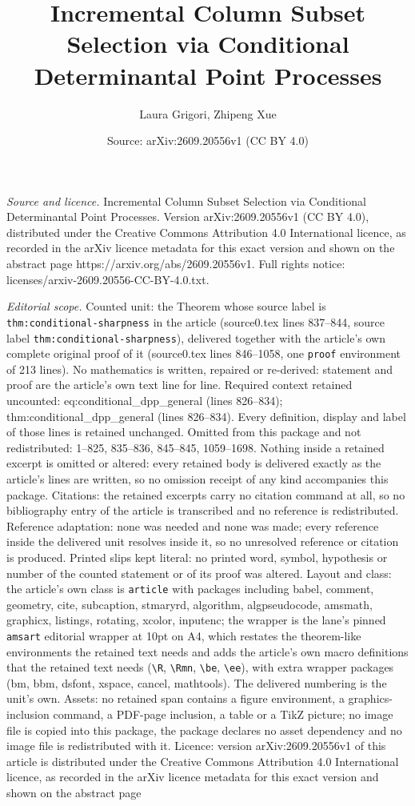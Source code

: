 \documentclass[10pt,a4paper]{amsart}
\title[Incremental Column Subset Selection via Conditional Determin]{Incremental Column Subset Selection via Conditional Determinantal Point Processes}
\author{Laura Grigori, Zhipeng Xue}
\date{Source: arXiv:2609.20556v1 (CC BY 4.0)}
\begin{document}
\maketitle

\noindent\emph{Source and licence.} Incremental Column Subset Selection via Conditional Determinantal Point Processes. Version arXiv:2609.20556v1 (CC BY 4.0), distributed under the Creative Commons Attribution 4.0 International licence, as recorded in the arXiv licence metadata for this exact version and shown on the abstract page https://arxiv.org/abs/2609.20556v1. Full rights notice: licenses/arxiv-2609.20556-CC-BY-4.0.txt.\par\smallskip

\noindent\textit{Editorial scope.} Counted unit: the Theorem whose source label is \texttt{thm:conditional-sharpness} in the article (source0.tex lines 837--844, source label \texttt{thm:conditional-sharpness}), delivered together with the article's own complete original proof of it (source0.tex lines 846--1058, one \texttt{proof} environment of 213 lines). No mathematics is written, repaired or re-derived: statement and proof are the article's own text line for line. Required context retained uncounted: eq:conditional\_dpp\_general (lines 826--834); thm:conditional\_dpp\_general (lines 826--834). Every definition, display and label of those lines is retained unchanged. Omitted from this package and not redistributed: 1--825, 835--836, 845--845, 1059--1698. Nothing inside a retained excerpt is omitted or altered: every retained body is delivered exactly as the article's lines are written, so no omission receipt of any kind accompanies this package. Citations: the retained excerpts carry no citation command at all, so no bibliography entry of the article is transcribed and no reference is redistributed. Reference adaptation: none was needed and none was made; every reference inside the delivered unit resolves inside it, so no unresolved reference or citation is produced. Printed slips kept literal: no printed word, symbol, hypothesis or number of the counted statement or of its proof was altered. Layout and class: the article's own class is \texttt{article} with packages including babel, comment, geometry, cite, subcaption, stmaryrd, algorithm, algpseudocode, amsmath, graphicx, listings, rotating, xcolor, inputenc; the wrapper is the lane's pinned \texttt{amsart} editorial wrapper at 10pt on A4, which restates the theorem-like environments the retained text needs and adds the article's own macro definitions that the retained text needs (\texttt{\textbackslash R}, \texttt{\textbackslash Rmn}, \texttt{\textbackslash be}, \texttt{\textbackslash ee}), with extra wrapper packages (bm, bbm, dsfont, xspace, cancel, mathtools). The delivered numbering is the unit's own. Assets: no retained span contains a figure environment, a graphics-inclusion command, a PDF-page inclusion, a table or a TikZ picture; no image file is copied into this package, the package declares no asset dependency and no image file is redistributed with it. Licence: version arXiv:2609.20556v1 of this article is distributed under the Creative Commons Attribution 4.0 International licence, as recorded in the arXiv licence metadata for this exact version and shown on the abstract page 
\end{document}
